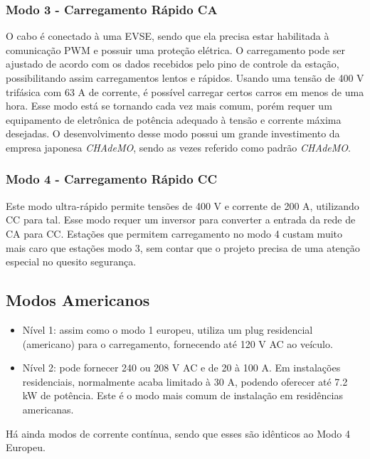         \subsubsection{Modo 3 - Carregamento Rápido CA}

        O cabo é conectado à uma \ac{EVSE}, sendo que ela precisa estar habilitada à comunicação PWM e possuir uma proteção elétrica. O carregamento pode ser ajustado de acordo com os dados recebidos pelo pino de controle da estação, possibilitando assim carregamentos lentos e rápidos. Usando uma tensão de 400 V trifásica com 63 A de corrente, é possível carregar certos carros em menos de uma hora. Esse modo está se tornando cada vez mais comum, porém requer um equipamento de eletrônica de potência adequado à tensão e corrente máxima desejadas. O desenvolvimento desse modo possui um grande investimento da empresa japonesa \textit{CHAdeMO}, sendo as vezes referido como padrão \textit{CHAdeMO}.

        \subsubsection{Modo 4 - Carregamento Rápido CC}

        Este modo ultra-rápido permite tensões de 400 V e corrente de 200 A, utilizando \ac{CC} para tal. Esse modo requer um inversor para converter a entrada da rede de CA para CC. Estações que permitem carregamento no modo 4 custam muito mais caro que estações modo 3, sem contar que o projeto precisa de uma atenção especial no quesito segurança.

    \subsection{Modos Americanos}

      \begin{itemize}
        \item Nível 1: assim como o modo 1 europeu, utiliza um plug residencial (americano) para o carregamento, fornecendo até 120 V AC ao veículo.
        \item Nível 2: pode fornecer 240 ou 208 V AC e de 20 à 100 A. Em instalações residenciais, normalmente acaba limitado à 30 A, podendo oferecer até 7.2 kW de potência. Este é o modo mais comum de instalação em residências americanas.
      \end{itemize}

      Há ainda modos de corrente contínua, sendo que esses são idênticos ao Modo 4 Europeu.

